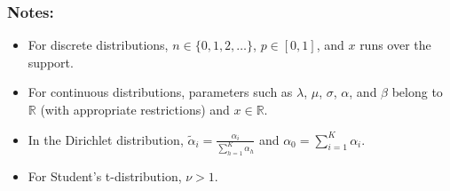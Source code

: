 \subsubsection*{Notes:}
\begin{itemize}
    \item For discrete distributions, $n\in\{0,1,2,\dots\}$, $p\in[0,1]$, and $x$ runs over the support.
    \item For continuous distributions, parameters such as $\lambda$, $\mu$, $\sigma$, $\alpha$, and $\beta$ belong to $\mathbb{R}$ (with appropriate restrictions) and $x\in\mathbb{R}$.
    \item In the Dirichlet distribution, $\tilde{\alpha}_i=\frac{\alpha_i}{\sum_{h=1}^K\alpha_h}$ and $\alpha_0=\sum_{i=1}^K \alpha_i$.
    \item For Student's t-distribution, $\nu>1$.
\end{itemize}
